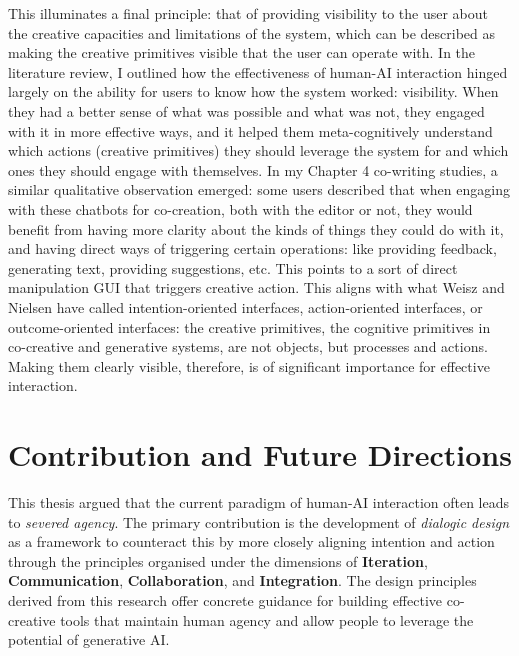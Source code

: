 This illuminates a final principle: that of providing visibility to the user about the creative capacities and limitations of the system, which can be described as making the creative primitives visible that the user can operate with. In the literature review, I outlined how the effectiveness of human-AI interaction hinged largely on the ability for users to know how the system worked: visibility. When they had a better sense of what was possible and what was not, they engaged with it in more effective ways, and it helped them meta-cognitively understand which actions (creative primitives) they should leverage the system for and which ones they should engage with themselves. In my Chapter 4 co-writing studies, a similar qualitative observation emerged: some users described that when engaging with these chatbots for co-creation, both with the editor or not, they would benefit from having more clarity about the kinds of things they could do with it, and having direct ways of triggering certain operations: like providing feedback, generating text, providing suggestions, etc. This points to a sort of direct manipulation GUI that triggers creative action. This aligns with what Weisz and Nielsen have called intention-oriented interfaces, action-oriented interfaces, or outcome-oriented interfaces: the creative primitives, the cognitive primitives in co-creative and generative systems, are not objects, but processes and actions. Making them clearly visible, therefore, is of significant importance for effective interaction.


\section{Contribution and Future Directions}
This thesis argued that the current paradigm of human-AI interaction often leads to \textit{severed agency}. The primary contribution is the development of \textit{dialogic design} as a framework to counteract this by more closely aligning intention and action through the principles organised under the dimensions of \textbf{Iteration}, \textbf{Communication}, \textbf{Collaboration}, and \textbf{Integration}. The design principles derived from this research offer concrete guidance for building effective co-creative tools that maintain human agency and allow people to leverage the potential of generative AI.


